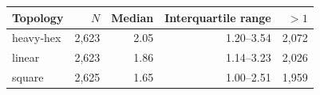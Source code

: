 \par\begin{center}\begin{minipage}{\linewidth}\def\@captype{table}
\centering
\caption{Matched two-qubit depth ratios relative to all-to-all. Support excludes zero baselines; the final column counts ratios above one.}
\label{tab:topology}
\begin{tabular}{lrrrr}
\toprule
Topology & $N$ & Median & Interquartile range & $>1$ \\
\midrule
heavy-hex & 2,623 & 2.05 & 1.20--3.54 & 2,072 \\
linear & 2,623 & 1.86 & 1.14--3.23 & 2,026 \\
square & 2,625 & 1.65 & 1.00--2.51 & 1,959 \\
\bottomrule
\end{tabular}
\end{minipage}\end{center}\par
